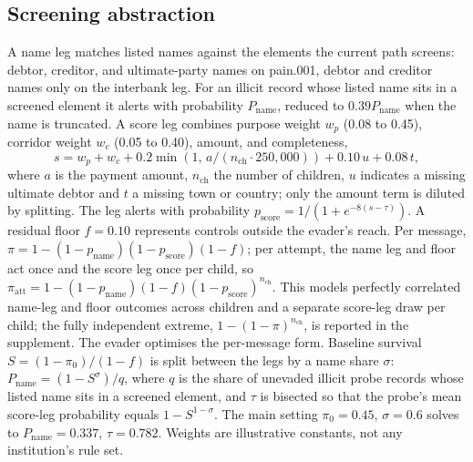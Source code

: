 \documentclass[conference]{IEEEtran}
\begin{document}
\subsection{Screening abstraction}
A name leg matches listed names against the elements the current path
screens: debtor, creditor, and ultimate-party names on pain.001, debtor and
creditor names only on the interbank leg. For an illicit record whose listed
name sits in a screened element it alerts with probability $P_{\mathrm{name}}$,
reduced to $0.39P_{\mathrm{name}}$ when the name is truncated. A score leg
combines purpose weight $w_p$ (0.08 to 0.45), corridor weight $w_c$ (0.05 to
0.40), amount, and completeness,
\begin{equation}
 s=w_p+w_c+0.2\min(1,\,a/(n_{\mathrm{ch}}\cdot 250{,}000))+0.10\,u+0.08\,t,
 \label{eq:score}
\end{equation}
where $a$ is the payment amount, $n_{\mathrm{ch}}$ the number of children, $u$
indicates a missing ultimate debtor and $t$ a missing town or country; only
the amount term is diluted by splitting. The leg alerts with probability
$p_{\mathrm{score}}=1/(1+e^{-8(s-\tau)})$. A residual floor $f=0.10$ represents
controls outside the evader's reach. Per message,
$\pi=1-(1-p_{\mathrm{name}})(1-p_{\mathrm{score}})(1-f)$; per attempt, the
name leg and floor act once and the score leg once per child, so
$\pi_{\mathrm{att}}=1-(1-p_{\mathrm{name}})(1-f)(1-p_{\mathrm{score}})^{n_{\mathrm{ch}}}$.
This models perfectly correlated name-leg and floor outcomes across
children and a separate score-leg draw per child; the fully independent
extreme, $1-(1-\pi)^{n_{\mathrm{ch}}}$, is reported in the supplement. The
evader optimises the per-message form. Baseline survival $S=(1-\pi_0)/(1-f)$ is split between the legs by a name
share $\sigma$: $P_{\mathrm{name}}=(1-S^{\sigma})/q$, where $q$ is the share
of unevaded illicit probe records whose listed name sits in a screened
element, and $\tau$ is bisected so that the probe's mean score-leg
probability equals $1-S^{1-\sigma}$. The main setting $\pi_0=0.45$,
$\sigma=0.6$ solves to $P_{\mathrm{name}}=0.337$, $\tau=0.782$. Weights
are illustrative constants, not any institution's rule set.
\end{document}
